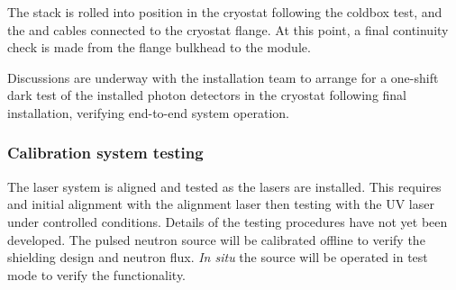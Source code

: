 The  stack is rolled into position in the cryostat following the coldbox test, and the  and  cables connected to the cryostat flange.  At this point, a final continuity check is made from the flange bulkhead to the  module.

Discussions are underway with the installation team to arrange for a one-shift dark test of the installed photon detectors in the cryostat following final installation, verifying end-to-end system operation.

\subsubsection{Calibration system testing}
The laser system is aligned and tested as the lasers are installed. This requires and initial alignment with the alignment laser then testing with the UV laser under controlled conditions. Details of the testing procedures have not yet been developed. The pulsed neutron source will be calibrated offline to verify the shielding design and neutron flux. {\it In situ} the source will be operated in test mode to verify the functionality. 

